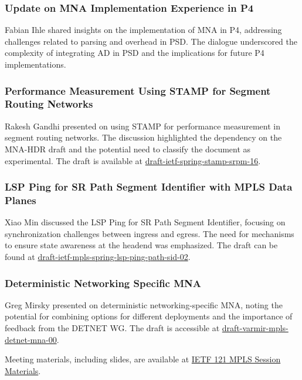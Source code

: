 \documentclass{article}
\begin{document}
\subsubsection{Update on MNA Implementation Experience in P4}
Fabian Ihle shared insights on the implementation of MNA in P4, addressing challenges related to parsing and overhead in PSD. The dialogue underscored the complexity of integrating AD in PSD and the implications for future P4 implementations.

\subsubsection{Performance Measurement Using STAMP for Segment Routing Networks}
Rakesh Gandhi presented on using STAMP for performance measurement in segment routing networks. The discussion highlighted the dependency on the MNA-HDR draft and the potential need to classify the document as experimental. The draft is available at \href{https://datatracker.ietf.org/doc/draft-ietf-spring-stamp-srpm-16}{draft-ietf-spring-stamp-srpm-16}.

\subsubsection{LSP Ping for SR Path Segment Identifier with MPLS Data Planes}
Xiao Min discussed the LSP Ping for SR Path Segment Identifier, focusing on synchronization challenges between ingress and egress. The need for mechanisms to ensure state awareness at the headend was emphasized. The draft can be found at \href{https://datatracker.ietf.org/doc/draft-ietf-mpls-spring-lsp-ping-path-sid-02}{draft-ietf-mpls-spring-lsp-ping-path-sid-02}.

\subsubsection{Deterministic Networking Specific MNA}
Greg Mirsky presented on deterministic networking-specific MNA, noting the potential for combining options for different deployments and the importance of feedback from the DETNET WG. The draft is accessible at \href{https://datatracker.ietf.org/doc/draft-varmir-mpls-detnet-mna-00}{draft-varmir-mpls-detnet-mna-00}.

Meeting materials, including slides, are available at \href{https://datatracker.ietf.org/meeting/121/session/mpls/}{IETF 121 MPLS Session Materials}.




\newpage
\end{document}
